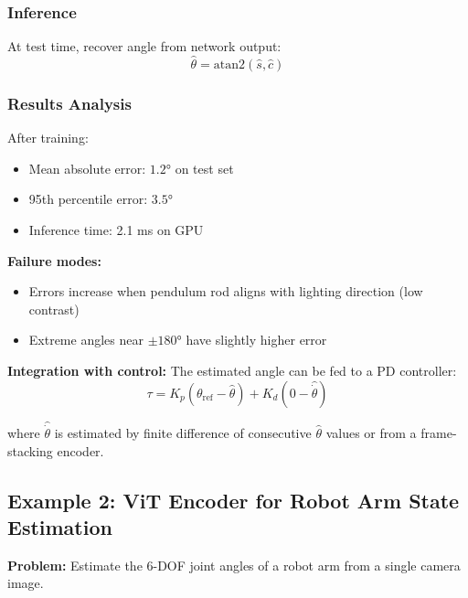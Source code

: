 \subsubsection{Inference}

At test time, recover angle from network output:
\begin{equation}
\hat{\theta} = \text{atan2}(\hat{s}, \hat{c})
\label{eq:pendulum_inference}
\end{equation}

\subsubsection{Results Analysis}

After training:
\begin{itemize}
    \item Mean absolute error: $1.2°$ on test set
    \item 95th percentile error: $3.5°$
    \item Inference time: 2.1 ms on GPU
\end{itemize}

\textbf{Failure modes:}
\begin{itemize}
    \item Errors increase when pendulum rod aligns with lighting direction (low contrast)
    \item Extreme angles near $\pm 180°$ have slightly higher error
\end{itemize}

\textbf{Integration with control:}
The estimated angle can be fed to a PD controller:
\begin{equation}
\tau = K_p (\theta_{\text{ref}} - \hat{\theta}) + K_d (0 - \hat{\dot{\theta}})
\label{eq:pendulum_pd}
\end{equation}

where $\hat{\dot{\theta}}$ is estimated by finite difference of consecutive $\hat{\theta}$ values or from a frame-stacking encoder.


\subsection{Example 2: ViT Encoder for Robot Arm State Estimation}

\textbf{Problem:} Estimate the 6-DOF joint angles of a robot arm from a single camera image.

